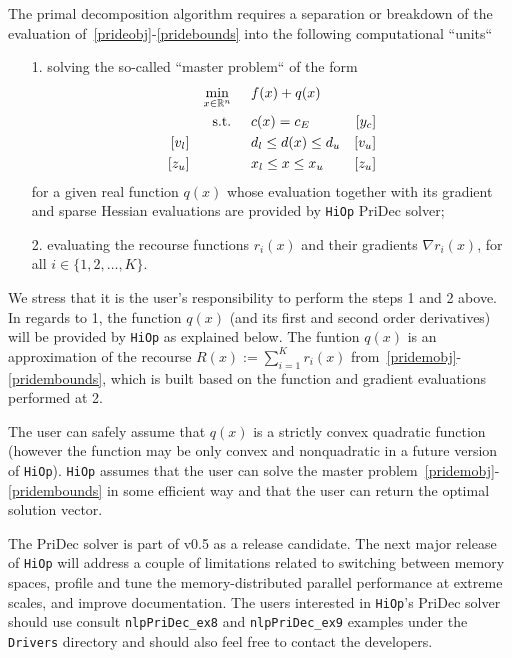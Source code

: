\documentclass[11pt]{article}
\newcommand{\Hi}{\texttt{HiOp}\xspace}
\begin{document}
The primal decomposition algorithm requires a separation or breakdown of the evaluation of~\eqref{prideobj}-\eqref{pridebounds} into the following computational ``units``
\begin{itemize}
\item[1.] solving the so-called ``master problem`` of the form
  \begin{align}
&&&&\min_{x\in\mathbb{R}^n} & \hspace{0.5cm} f(x) + q(x) &&&& \label{pridemobj}\\
&&&&\textnormal{s.t.} &\hspace{0.5cm}  c(x)=c_E &[y_c]&&&\\
&&[v_l]&&& \hspace{0.5cm} d_l \leq d(x) \leq d_u  &[v_u]&&&\label{pridemineq} \\
&&[z_u]&&& \hspace{0.5cm} x_l \leq x \leq x_u & [z_u] &&&\label{pridembounds}
  \end{align}
for a given real function $q(x)$ whose evaluation together with its gradient and sparse Hessian evaluations are provided by \Hi PriDec solver;
\item[2.] evaluating the recourse functions $r_i(x)$ and their gradients $\nabla r_i(x)$, for all $i\in\{1,2,\ldots, K\}$.
\end{itemize}
We stress that it is the user's responsibility to perform the steps 1 and 2 above. In regards to 1, the function $q(x)$ (and its first and second order derivatives) will be provided by \Hi as explained below. The funtion $q(x)$ is an approximation of the recourse $R(x):=\sum_{i=1}^K r_i(x)$ from~\eqref{pridemobj}-\eqref{pridembounds}, which is built based on the function and gradient evaluations performed at 2.

The user can safely assume that $q(x)$ is a strictly  convex quadratic function (however the function may be only convex and nonquadratic in a future version of \Hi). \Hi assumes that the user can solve the master problem~\eqref{pridemobj}-\eqref{pridembounds} in some efficient way and that the user can return the optimal solution vector.

\bigskip

The PriDec solver is part of v0.5 as a release candidate. The next major release of \Hi will address a couple of limitations related to switching between memory spaces, profile and tune the memory-distributed parallel performance at extreme scales, and improve documentation. The users interested in \Hi's PriDec solver should use consult \texttt{nlpPriDec\_ex8} and \texttt{nlpPriDec\_ex9} examples under the \texttt{Drivers} directory and should also feel free to contact the developers.
\end{document}

